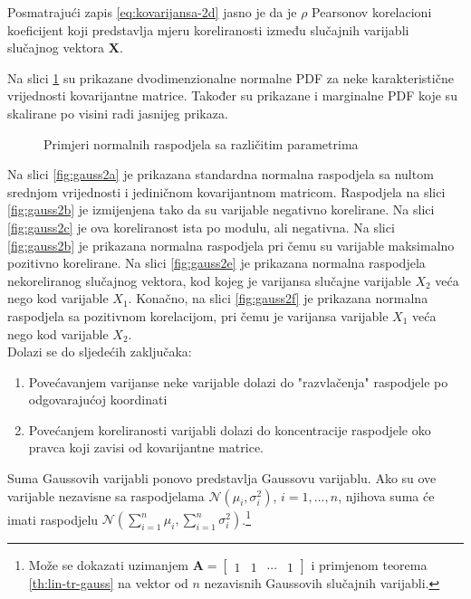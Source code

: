 Posmatrajući zapis \eqref{eq:kovarijansa-2d} jasno je da je $\rho$ Pearsonov
korelacioni koeficijent koji predstavlja mjeru koreliranosti između slučajnih
varijabli slučajnog vektora $\bm X$.

Na slici \ref{fig:gauss2} su prikazane dvodimenzionalne normalne PDF za neke
karakteristične vrijednosti kovarijantne matrice. Također su prikazane i
marginalne PDF koje su skalirane po visini radi jasnijeg prikaza.

\begin{figure}[H]
  \centering
	\caption{Primjeri normalnih raspodjela sa različitim parametrima}
	\label{fig:gauss2}
\end{figure}

Na slici \ref{fig:gauss2a} je prikazana standardna normalna raspodjela sa nultom
srednjom vrijednosti i jediničnom kovarijantnom matricom. Raspodjela na slici
\ref{fig:gauss2b} je izmijenjena tako da su varijable negativno korelirane. Na
slici \ref{fig:gauss2c} je ova koreliranost ista po modulu, ali negativna. Na
slici \ref{fig:gauss2b} je prikazana normalna raspodjela pri čemu su varijable
maksimalno pozitivno korelirane. Na slici \ref{fig:gauss2e} je prikazana
normalna raspodjela nekoreliranog slučajnog vektora, kod kojeg je varijansa
slučajne varijable $X_2$ veća nego kod varijable $X_1$. Konačno, na slici
\ref{fig:gauss2f} je prikazana normalna raspodjela sa pozitivnom korelacijom,
pri čemu je varijansa varijable $X_1$ veća nego kod varijable $X_2$.\\

\noindent
Dolazi se do sljedećih zaključaka:
\begin{enumerate}
	\item Povećavanjem varijanse neke varijable dolazi do "razvlačenja" raspodjele
		po odgovarajućoj koordinati
	\item Povećanjem koreliranosti varijabli dolazi do koncentracije raspodjele
		oko pravca koji zavisi od kovarijantne matrice.
\end{enumerate}

\begin{corollary}
  Suma Gaussovih varijabli ponovo predstavlja Gaussovu varijablu. Ako su ove
  varijable nezavisne sa raspodjelama $\mathcal{N}(\mu_i, \sigma_i^2)$,
  $i=1,...,n$, njihova suma će imati raspodjelu
  $\mathcal{N}(\sum_{i=1}^{n}\mu_i, \sum_{i=1}^{n}\sigma_i^2)$.\footnote{
    Može se dokazati uzimanjem $\bm A = \left[
        \begin{array}{cccc}
          1 & 1 & \cdots & 1
        \end{array}\right]$
    i primjenom teorema \ref{th:lin-tr-gauss} na vektor od $n$ nezavisnih
    Gaussovih slučajnih varijabli.
  }
\end{corollary}

